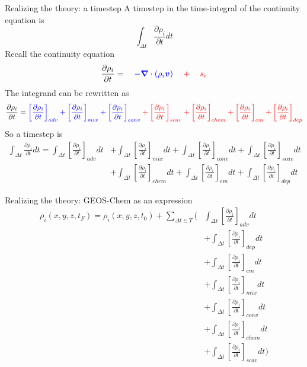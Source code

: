 \documentclass[10pt]{beamer}
\begin{document}
\begin{frame}[fragile]{Realizing the theory: a timestep}
    A timestep in the time-integral of the continuity equation is
    $$\int_{\Delta t} \frac{\partial \rho_i}{\partial t} dt$$
    Recall the continuity equation
    $$
        \frac{\partial \rho_i}{\partial t} =   \quad \color{blue} -\boldsymbol \nabla \cdot (\rho_i \boldsymbol v) \quad \color{red} + \quad s_i
    $$
    \pause
    \normalsize
    The integrand can be rewritten as
    \tiny
    $$
        \frac{\partial \rho_i}{\partial t} = 
        \color{blue}
        \left[ \frac{\partial \rho_i}{\partial t} \right]_{adv} + 
        \left[ \frac{\partial \rho_i}{\partial t} \right]_{mix} + 
        \left[ \frac{\partial \rho_i}{\partial t} \right]_{conv} \color{red} + 
        \left[ \frac{\partial \rho_i}{\partial t} \right]_{scav} + 
        \left[ \frac{\partial \rho_i}{\partial t} \right]_{chem} + 
        \left[ \frac{\partial \rho_i}{\partial t} \right]_{em} + 
        \left[ \frac{\partial \rho_i}{\partial t} \right]_{dep}
    $$
    \pause
    \normalsize
    So a timestep is
    \tiny
    \begin{align*}
        \int_{\Delta t}\frac{\partial \rho_i}{\partial t} dt = 
        \int_{\Delta t}\left[ \frac{\partial \rho_i}{\partial t} \right]_{adv} dt 
        & + \int_{\Delta t}\left[ \frac{\partial \rho_i}{\partial t} \right]_{mix} dt + 
        \int_{\Delta t}\left[ \frac{\partial \rho_i}{\partial t} \right]_{conv} dt +
        \int_{\Delta t}\left[ \frac{\partial \rho_i}{\partial t} \right]_{scav} dt \\ 
        & + \int_{\Delta t}\left[ \frac{\partial \rho_i}{\partial t} \right]_{chem} dt + 
        \int_{\Delta t}\left[ \frac{\partial \rho_i}{\partial t} \right]_{em} dt + 
        \int_{\Delta t}\left[ \frac{\partial \rho_i}{\partial t} \right]_{dep} dt
    \end{align*}
\end{frame}

\begin{frame}[fragile]{Realizing the theory: GEOS-Chem as an expression}
    \small
    \begin{align*}
        \rho_i(x, y, z, t_F) = \rho_i(x, y, z, t_0) + \sum_{\Delta t \in T} (
        & \int_{\Delta t}\left[ \frac{\partial \rho_i}{\partial t} \right]_{adv} dt \\& + 
        \int_{\Delta t}\left[ \frac{\partial \rho_i}{\partial t} \right]_{dep} dt \\ & + 
        \int_{\Delta t}\left[ \frac{\partial \rho_i}{\partial t} \right]_{em} dt \\& +
        \int_{\Delta t}\left[ \frac{\partial \rho_i}{\partial t} \right]_{mix} dt \\ & + 
        \int_{\Delta t}\left[ \frac{\partial \rho_i}{\partial t} \right]_{conv} dt \\& +
        \int_{\Delta t}\left[ \frac{\partial \rho_i}{\partial t} \right]_{chem} dt \\ & + 
        \int_{\Delta t}\left[ \frac{\partial \rho_i}{\partial t} \right]_{scav} dt )
    \end{align*}
\end{frame}
\end{document}

